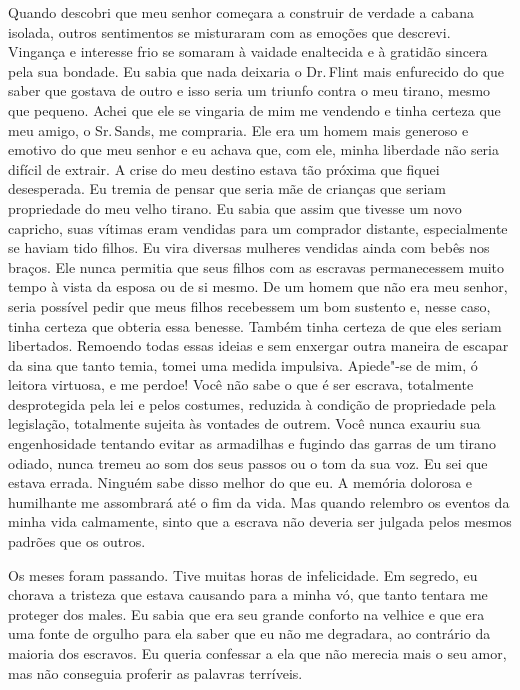 Quando descobri que meu senhor começara
a construir de verdade a cabana isolada, outros sentimentos se
misturaram com as emoções que descrevi. Vingança e interesse frio se
somaram à vaidade enaltecida e à gratidão sincera pela sua bondade. Eu
sabia que nada deixaria o Dr.\,Flint mais enfurecido do que saber que
gostava de outro e isso seria um triunfo contra o meu tirano, mesmo que
pequeno. Achei que ele se vingaria de mim me vendendo e tinha certeza
que meu amigo, o Sr.\,Sands, me compraria. Ele era um homem mais generoso
e emotivo do que meu senhor e eu achava que, com ele, minha liberdade
não seria difícil de extrair. A crise do meu destino estava tão próxima
que fiquei desesperada. Eu tremia de pensar que seria mãe de crianças
que seriam propriedade do meu velho tirano. Eu sabia que assim que
tivesse um novo capricho, suas vítimas eram vendidas para um comprador
distante, especialmente se haviam tido filhos. Eu vira diversas mulheres
vendidas ainda com bebês nos braços. Ele nunca permitia que seus filhos
com as escravas permanecessem muito tempo à vista da esposa ou de si
mesmo. De um homem que não era meu senhor, seria possível pedir que meus
filhos recebessem um bom sustento e, nesse caso, tinha certeza que
obteria essa benesse. Também tinha certeza de que eles seriam
libertados. Remoendo todas essas ideias e sem enxergar outra maneira de
escapar da sina que tanto temia, tomei uma medida impulsiva. Apiede"-se
de mim, ó leitora virtuosa, e me perdoe! Você não sabe o que é ser
escrava, totalmente desprotegida pela lei e pelos costumes, reduzida à
condição de propriedade pela legislação, totalmente sujeita às vontades
de outrem. Você nunca exauriu sua engenhosidade tentando evitar as
armadilhas e fugindo das garras de um tirano odiado, nunca tremeu ao som
dos seus passos ou o tom da sua voz. Eu sei que estava errada. Ninguém
sabe disso melhor do que eu. A memória dolorosa e humilhante me
assombrará até o fim da vida. Mas quando relembro os eventos da minha
vida calmamente, sinto que a escrava não deveria ser julgada pelos
mesmos padrões que os outros.

Os meses foram passando. Tive muitas
horas de infelicidade. Em segredo, eu chorava a tristeza que estava
causando para a minha vó, que tanto tentara me proteger dos males. Eu
sabia que era seu grande conforto na velhice e que era uma fonte de
orgulho para ela saber que eu não me degradara, ao contrário da maioria
dos escravos. Eu queria confessar a ela que não merecia mais o seu amor,
mas não conseguia proferir as palavras terríveis.

